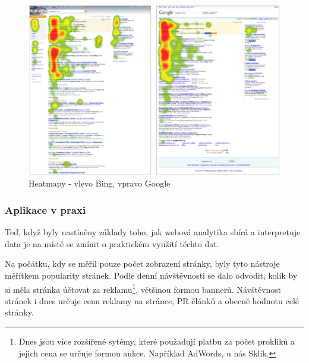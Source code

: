 \documentclass[bc,male,java,dept456]{diploma}						%
\begin{document}
\begin{figure}[hp]
	\centering
	\includegraphics[width=14cm]{img/google-bing-heatmap.pdf}
	\caption{Heatmapy - vlevo Bing, vpravo Google}
	\label{img:heatmap-bing-google}
\end{figure}






\subsubsection{Aplikace v praxi}

Teď, když byly nastíněny základy toho, jak webová analytika sbírá a interpretuje data je na místě se zmínit o praktickém využití těchto dat.


Na počátku, kdy se měřil pouze počet zobrazení stránky, byly tyto nástroje měřítkem popularity stránek. Podle denní návštěvnosti se dalo odvodit, kolik by si měla stránka účtovat za reklamu\footnote{Dnes jsou více rozšířené sytémy, které použadují platbu za počet prokliků a jejich cena se určuje formou aukce. Například AdWords, u nás Sklik.}, většinou formou bannerů. Návštěvnost stránek i dnes určuje cenu reklamy na stránce, PR článků a obecně hodnotu celé stránky.
\end{document}
